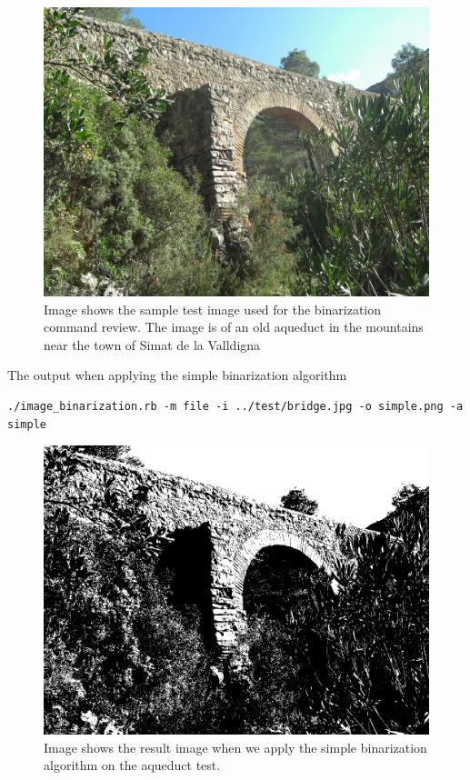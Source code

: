 \documentclass[a4paper,10pt,titlepage]{article}
\begin{document}
\par \begin{figure}[H]
	\centerline{%
	\includegraphics[scale=0.3]{./images/bridge.jpg}
	}
	\caption[Original base aqueduct image]{Image shows the sample test image used for the binarization command review. The image is of an old aqueduct in the mountains near the town of Simat de la Valldigna}
\end{figure}

\par The output when applying the simple binarization algorithm
{\footnotesize\begin{verbatim}
./image_binarization.rb -m file -i ../test/bridge.jpg -o simple.png -a simple
\end{verbatim}}

\par \begin{figure}[H]
	\centerline{%
	\includegraphics[scale=0.3]{./images/simple.png}
	}
	\caption[Simple binarization sample]{Image shows the result image when we apply the simple binarization algorithm on the aqueduct test.}
\end{figure}
\end{document}
